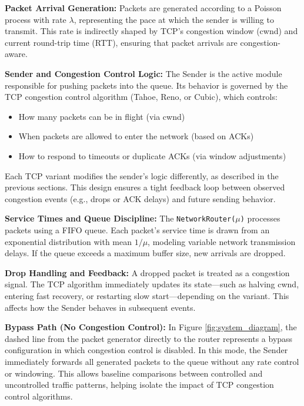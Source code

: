 \documentclass[conference]{IEEEtran}
\begin{document}
\noindent \textbf{Packet Arrival Generation:} Packets are generated according to a Poisson process with rate $\lambda$, representing the pace at which the sender is willing to transmit. 
This rate is indirectly shaped by TCP’s congestion window (cwnd) and current round-trip time (RTT), ensuring that packet arrivals are congestion-aware.

\noindent \textbf{Sender and Congestion Control Logic:} The Sender is the active module responsible for pushing packets into the queue. 
Its behavior is governed by the TCP congestion control algorithm (Tahoe, Reno, or Cubic), which controls:
\begin{itemize}[]
    \item How many packets can be in flight (via cwnd)
    \item When packets are allowed to enter the network (based on ACKs)
    \item How to respond to timeouts or duplicate ACKs (via window adjustments)
\end{itemize}
Each TCP variant modifies the sender's logic differently, as described in the previous sections.
This design ensures a tight feedback loop between observed congestion events (e.g., drops or ACK delays) and future sending behavior.

\noindent \textbf{Service Times and Queue Discipline:} The \texttt{NetworkRouter($\mu$)} processes packets using a FIFO queue. 
Each packet’s service time is drawn from an exponential distribution with mean $1/\mu$, modeling variable network transmission delays. 
If the queue exceeds a maximum buffer size, new arrivals are dropped.

\noindent \textbf{Drop Handling and Feedback:} A dropped packet is treated as a congestion signal. 
The TCP algorithm immediately updates its state—such as halving cwnd, entering fast recovery, or restarting slow start—depending on the variant. 
This affects how the Sender behaves in subsequent events.

\noindent \textbf{Bypass Path (No Congestion Control):}
In Figure \ref{fig:system_diagram}, the dashed line from the packet generator directly to the router represents a bypass configuration in which congestion control is disabled. 
In this mode, the Sender immediately forwards all generated packets to the queue without any rate control or windowing. 
This allows baseline comparisons between controlled and uncontrolled traffic patterns, helping isolate the impact of TCP congestion control algorithms.
\end{document}
